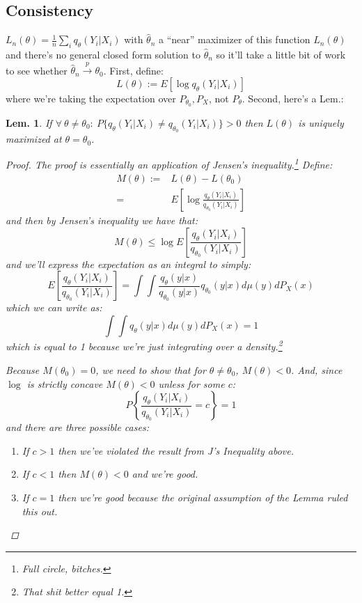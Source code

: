 \documentclass{tufte-book}
\theoremstyle{mytheoremstyle}
\theoremstyle{mylemstyle}
\newtheorem*{lem}{Lem.}
\theoremstyle{mydefstyle}
\begin{document}
\subsection{Consistency} 
 \(L_n(\theta) = \frac{1}{n} \sum_i q_\theta (Y_i|X_i)\) with \(\hat{\theta}_n\) a ``near'' maximizer of this function \(L_n(\theta)\) and there's no general closed form solution to \(\hat{\theta}_n\) so it'll take a little bit of work to see whether \(\hat{\theta}_n \overset{p}{\rightarrow} \theta_0\). First, define:
	\[L(\theta) := E[\log q_\theta (Y_i | X_i)]\]
where we're taking the expectation over \(P_{\theta_0}, P_X\), not \(P_\theta\). Second, here's a Lem.:
\begin{lem} If \(\forall\ \theta \ne \theta_0:\ P\{q_\theta (Y_i | X_i) \ne q_{\theta_0} (Y_i | X_i)\} > 0\) then \(L(\theta)\) is uniquely maximized at \(\theta = \theta_0\). 
\begin{proof} The proof is essentially an application of Jensen's inequality.\footnote{Full circle, bitches.} Define:
	\begin{align*}
		M(\theta):=&L(\theta) - L(\theta_0) \\
				=&E\left[\log \frac{q_\theta(Y_i | X_i)}{q_{\theta_0} (Y_i | X_i)} \right]
	\end{align*}
and then by Jensen's inequality we have that:
	\[M(\theta) \le \log E \left[ \frac{q_\theta(Y_i | X_i)}{q_{\theta_0} (Y_i | X_i)} \right] \]
and we'll express the expectation as an integral to simply:
	\[E\left[\frac{q_\theta(Y_i | X_i)}{q_{\theta_0} (Y_i | X_i)} \right] = \int \int \frac{q_\theta(y | x)}{q_{\theta_0} (y | x)}  q_{\theta_0}(y|x) d\mu(y) dP_X(x)\]
which we can write as:
	\[\int \int q_\theta(y | x) d\mu(y) dP_X(x) = 1\]
which is equal to 1 because we're just integrating over a density.\footnote{That shit better equal 1.} 

Because \(M(\theta_0) = 0\), we need to show that for \(\theta \ne \theta_0\), \(M(\theta) < 0\). And, since \(\log\) is strictly concave \(M(\theta) < 0\) unless for some \(c\):
	\[P\left\{\frac{q_\theta(Y_i | X_i)}{q_{\theta_0} (Y_i | X_i)} = c \right\} = 1\]
and there are three possible cases: \begin{enumerate}
	\item If \(c > 1\) then we've violated the result from J's Inequality above. 
	\item If \(c < 1\) then \(M(\theta) < 0\) and we're good.
	\item If \(c = 1\) then we're good because the original assumption of the Lemma ruled this out. 
\end{enumerate}

\end{proof}
\end{lem}
\end{document}
